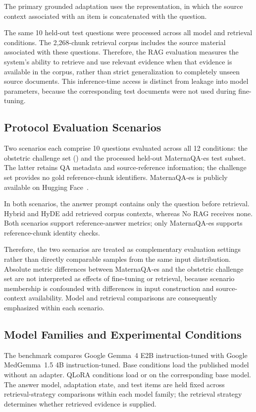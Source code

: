 The primary grounded adaptation uses the 
representation, in which the source context associated with an item is
concatenated with the question.

The same 10 held-out test questions were processed across all model and
retrieval conditions. The 2,268-chunk retrieval corpus includes the source
material associated with these questions. Therefore, the RAG evaluation
measures the system's ability to retrieve and use relevant evidence when
that evidence is available in the corpus, rather than strict generalization
to completely unseen source documents. This inference-time access is
distinct from leakage into model parameters, because the corresponding test
documents were not used during fine-tuning.

\subsection{Protocol Evaluation Scenarios}
Two scenarios each comprise 10 questions evaluated across all 12 conditions:
the obstetric challenge set () and the
processed held-out MaternaQA-es test subset. The latter retains QA metadata
and source-reference information; the challenge set provides no gold
reference-chunk identifiers. MaternaQA-es is publicly available on
Hugging Face~\cite{maternaqa2026}.

In both scenarios, the answer prompt contains only the question before
retrieval. Hybrid and HyDE add retrieved corpus contexts, whereas No RAG
receives none. Both scenarios support reference-answer metrics; only
MaternaQA-es supports reference-chunk identity checks.

Therefore, the two scenarios are treated as complementary evaluation
settings rather than directly comparable samples from the same input
distribution. Absolute metric differences between MaternaQA-es and the
obstetric challenge set are not interpreted as effects of fine-tuning or
retrieval, because scenario membership is confounded with differences in
input construction and source-context availability. Model and retrieval
comparisons are consequently emphasized within each scenario.

\subsection{Model Families and Experimental Conditions}
The benchmark compares Google Gemma~4 E2B instruction-tuned with Google
MedGemma~1.5 4B instruction-tuned. Base conditions load the published
model without an adapter. QLoRA conditions load
 or
 on the corresponding base
model. The answer model, adaptation state, and test items are held fixed across
retrieval-strategy comparisons within each model family; the retrieval
strategy determines whether retrieved evidence is supplied.

